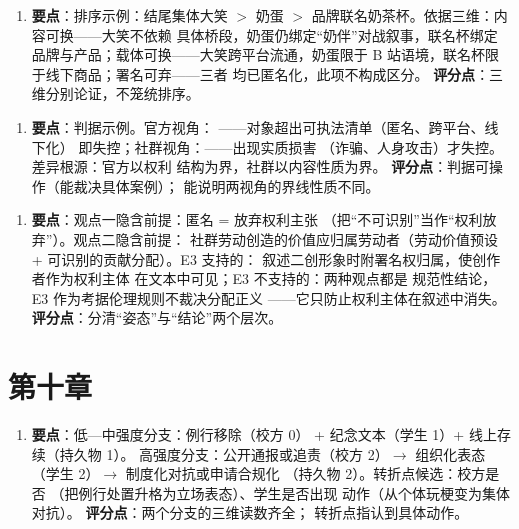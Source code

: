 \begin{enumerate}[label=\textbf{1.},leftmargin=2.6em]
  \item \textbf{要点}：排序示例：结尾集体大笑 $>$ 奶蛋 $>$
        品牌联名奶茶杯。依据三维：内容可换——大笑不依赖
        具体桥段，奶蛋仍绑定“奶伴”对战叙事，联名杯绑定
        品牌与产品；载体可换——大笑跨平台流通，奶蛋限于
        B 站语境，联名杯限于线下商品；署名可弃——三者
        均已匿名化，此项不构成区分。
        \textbf{评分点}：三维分别论证，不笼统排序。
\end{enumerate}

\begin{enumerate}[label=\textbf{2.},leftmargin=2.6em]
  \item \textbf{要点}：判据示例。官方视角：
        ——对象超出可执法清单（匿名、跨平台、线下化）
        即失控；社群视角：——出现实质损害
        （诈骗、人身攻击）才失控。差异根源：官方以权利
        结构为界，社群以内容性质为界。
        \textbf{评分点}：判据可操作（能裁决具体案例）；
        能说明两视角的界线性质不同。
\end{enumerate}

\begin{enumerate}[label=\textbf{3.},leftmargin=2.6em]
  \item \textbf{要点}：观点一隐含前提：匿名 = 放弃权利主张
        （把“不可识别”当作“权利放弃”）。观点二隐含前提：
        社群劳动创造的价值应归属劳动者（劳动价值预设 +
        可识别的贡献分配）。E3 支持的：
        叙述二创形象时附署名权归属，使创作者作为权利主体
        在文本中可见；E3 不支持的：两种观点都是
        规范性结论，E3 作为考据伦理规则不裁决分配正义
        ——它只防止权利主体在叙述中消失。
        \textbf{评分点}：分清“姿态”与“结论”两个层次。
\end{enumerate}

\section{第十章}\label{app:ans:10}

\begin{enumerate}[label=\textbf{1.},leftmargin=2.6em]
  \item \textbf{要点}：低—中强度分支：例行移除（校方 0）
        + 纪念文本（学生 1）+ 线上存续（持久物 1）。
        高强度分支：公开通报或追责（校方 2）$\to$
        组织化表态（学生 2）$\to$ 制度化对抗或申请合规化
        （持久物 2）。转折点候选：校方是否
        （把例行处置升格为立场表态）、学生是否出现
        动作（从个体玩梗变为集体对抗）。
        \textbf{评分点}：两个分支的三维读数齐全；
        转折点指认到具体动作。
\end{enumerate}


